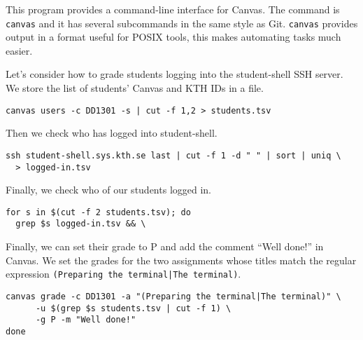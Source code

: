 
This program provides a command-line interface for Canvas.
The command is \texttt{canvas} and it has several subcommands in the same style 
as Git.
\texttt{canvas} provides output in a format useful for POSIX tools, this makes 
automating tasks much easier.

Let's consider how to grade students logging into the student-shell SSH server.
We store the list of students' Canvas and KTH IDs in a file.
\begin{lstlisting}
canvas users -c DD1301 -s | cut -f 1,2 > students.tsv
\end{lstlisting}
Then we check who has logged into student-shell.
\begin{lstlisting}[firstnumber=2]
ssh student-shell.sys.kth.se last | cut -f 1 -d " " | sort | uniq \
  > logged-in.tsv
\end{lstlisting}
Finally, we check who of our students logged in.
\begin{lstlisting}[firstnumber=4]
for s in $(cut -f 2 students.tsv); do
  grep $s logged-in.tsv && \
\end{lstlisting}
Finally, we can set their grade to P and add the comment \enquote{Well done!} 
in Canvas.
We set the grades for the two assignments whose titles match the regular 
expression \texttt{(Preparing the terminal|The terminal)}.
\begin{lstlisting}[firstnumber=6]
    canvas grade -c DD1301 -a "(Preparing the terminal|The terminal)" \
      -u $(grep $s students.tsv | cut -f 1) \
      -g P -m "Well done!"
done
\end{lstlisting}

